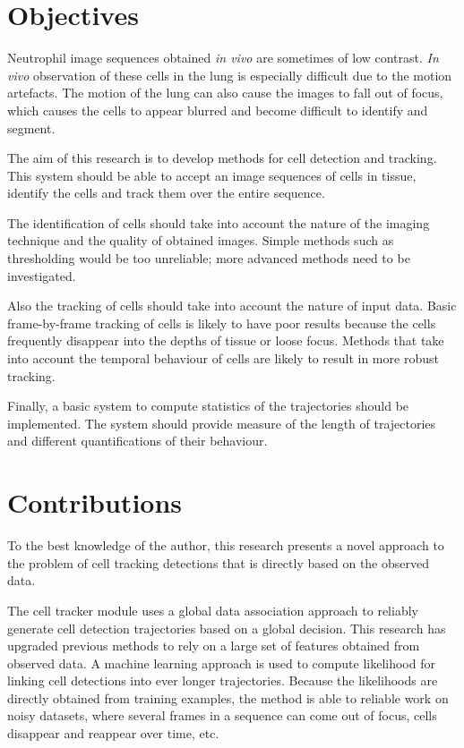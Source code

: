 	\section{Objectives \statusfirstdraft}
		
		Neutrophil image sequences obtained \textit{in vivo} are sometimes of low contrast. \textit{In vivo} observation of these cells in the lung is especially difficult due to the motion artefacts. The motion of the lung can also cause the images to fall out of focus, which causes the cells to appear blurred and become difficult to identify and segment.
		
		The aim of this research is to develop methods for cell detection and tracking. This system should be able to accept an image sequences of cells in tissue, identify the cells and track them over the entire sequence.
		
		The identification of cells should take into account the nature of the imaging technique and the quality of obtained images. Simple methods such as thresholding would be too unreliable; more advanced methods need to be investigated.
		
		Also the tracking of cells should take into account the nature of input data. Basic frame-by-frame tracking of cells is likely to have poor results because the cells frequently disappear into the depths of tissue or loose focus. Methods that take into account the temporal behaviour of cells are likely to result in more robust tracking. 
		
		Finally, a basic system to compute statistics of the trajectories should be implemented. The system should provide measure of the length of trajectories and different quantifications of their behaviour.
		
	\section{Contributions \statusfirstdraft}
	
		To the best knowledge of the author, this research presents a novel approach to the problem of cell tracking detections that is directly based on the observed data.
		
		The cell tracker module uses a global data association approach to reliably generate cell detection trajectories based on a global decision. This research has upgraded previous methods to rely on a large set of features obtained from observed data. A machine learning approach is used to compute likelihood for linking cell detections into ever longer trajectories. Because the likelihoods are directly obtained from training examples, the method is able to reliable work on noisy datasets, where several frames in a sequence can come out of focus, cells disappear and reappear over time, etc.
		
